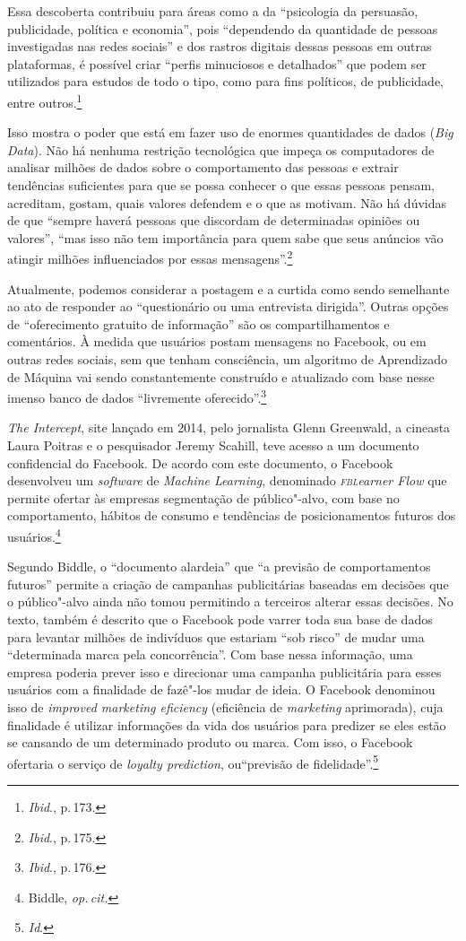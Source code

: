 Essa descoberta contribuiu para áreas como a da ``psicologia da
persuasão, publicidade, política e economia'', pois ``dependendo da
quantidade de pessoas investigadas nas redes sociais'' e dos rastros
digitais dessas pessoas em outras plataformas, é possível criar ``perfis
minuciosos e detalhados'' que podem ser utilizados para estudos de todo
o tipo, como para fins políticos, de publicidade, entre outros.\footnote{\textit{Ibid}., p.\,173.}

Isso mostra o poder que está em fazer uso de enormes quantidades de
dados (\textit{Big Data}). Não há nenhuma restrição tecnológica que impeça
os computadores de analisar milhões de dados sobre o comportamento das
pessoas e extrair tendências suficientes para que se possa conhecer o
que essas pessoas pensam, acreditam, gostam, quais valores defendem e o que as motivam. Não há dúvidas de que ``sempre haverá pessoas que discordam de determinadas opiniões ou valores'', ``mas isso não tem
importância para quem sabe que seus anúncios vão atingir milhões
influenciados por essas mensagens''.\footnote{\textit{Ibid}., p.\,175.}

Atualmente, podemos considerar a postagem e a curtida como sendo
semelhante ao ato de responder ao ``questionário ou uma entrevista
dirigida''. Outras opções de ``oferecimento gratuito de informação'' são
os compartilhamentos e comentários. À medida que usuários postam
mensagens no Facebook, ou em outras redes sociais, sem que tenham
consciência, um algoritmo de Aprendizado de Máquina vai sendo
constantemente construído e atualizado com base nesse imenso banco de
dados ``livremente oferecido''.\footnote{\textit{Ibid}., p.\,176.}

\textit{The Intercept}, site lançado em 2014, pelo jornalista Glenn
Greenwald, a cineasta Laura Poitras e o pesquisador Jeremy Scahill, teve
acesso a um documento confidencial do Facebook. De acordo com este
documento, o Facebook desenvolveu um \textit{software} de \textit{Machine
Learning}, denominado \textit{\textsc{fbl}earner Flow} que permite ofertar às
empresas segmentação de público"-alvo, com base no comportamento,
hábitos de consumo e tendências de posicionamentos futuros dos usuários.\footnote{Biddle, \textit{op.\,cit.}}

Segundo Biddle, o ``documento alardeia'' que ``a previsão de
comportamentos futuros'' permite a criação de campanhas publicitárias
baseadas em decisões que o público"-alvo ainda não tomou permitindo a
terceiros alterar essas decisões. No texto, também é descrito que o
Facebook pode varrer toda sua base de dados para levantar milhões de
indivíduos que estariam ``sob risco'' de mudar uma ``determinada marca
pela concorrência''. Com base nessa informação, uma empresa poderia
prever isso e direcionar uma campanha publicitária para esses usuários
com a finalidade de fazê"-los mudar de ideia.
O Facebook denominou isso de \textit{improved marketing eficiency} (eficiência de \textit{marketing}
aprimorada), cuja finalidade é utilizar informações da vida dos usuários
para predizer se eles estão se cansando de um determinado produto ou
marca. Com isso, o Facebook ofertaria o serviço de \textit{loyalty
prediction}, ou``previsão de fidelidade''.\footnote{\textit{Id}.}

